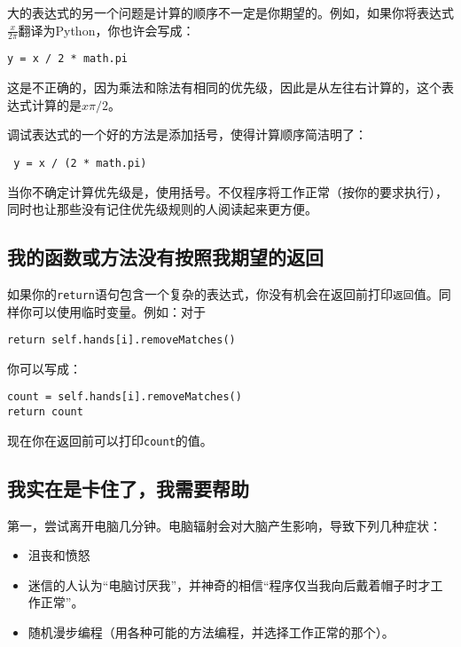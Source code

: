 
大的表达式的另一个问题是计算的顺序不一定是你期望的。例如，如果你将表达式$\frac{x}{2 \pi}$翻译为Python，你也许会写成：

\beforeverb
\begin{verbatim}
y = x / 2 * math.pi
\end{verbatim}
\afterverb
%
这是不正确的，因为乘法和除法有相同的优先级，因此是从左往右计算的，这个表达式计算的是$x \pi / 2$。

调试表达式的一个好的方法是添加括号，使得计算顺序简洁明了：

\beforeverb
\begin{verbatim}
 y = x / (2 * math.pi)
\end{verbatim}
\afterverb
%
当你不确定计算优先级是，使用括号。不仅程序将工作正常（按你的要求执行），同时也让那些没有记住优先级规则的人阅读起来更方便。


\subsection{我的函数或方法没有按照我期望的返回}

如果你的{\tt return}语句包含一个复杂的表达式，你没有机会在返回前打印{\tt 返回}值。同样你可以使用临时变量。例如：对于

\beforeverb
\begin{verbatim}
return self.hands[i].removeMatches()
\end{verbatim}
\afterverb
%
你可以写成：

\beforeverb
\begin{verbatim}
count = self.hands[i].removeMatches()
return count
\end{verbatim}
\afterverb
%
现在你在返回前可以打印{\tt count}的值。


\subsection{我实在是卡住了，我需要帮助}

第一，尝试离开电脑几分钟。电脑辐射会对大脑产生影响，导致下列几种症状：

\begin{itemize}

\item 沮丧和愤怒


\item 迷信的人认为“电脑讨厌我”，并神奇的相信“程序仅当我向后戴着帽子时才工作正常”。


\item 随机漫步编程（用各种可能的方法编程，并选择工作正常的那个）。


\end{itemize}

